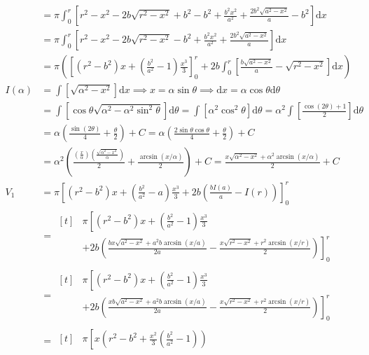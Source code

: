 \documentclass[12pt, A4]{report}
\renewcommand{\d}{\text{d}}
\begin{document}
\begin{enumerate}
\begin{enumerate}
\begin{align*}
									&= \pi\int_0^r\left[r^2 - x^2 - 2b\sqrt{r^2 - x^2} + b^2 - b^2 +  \frac{b^2x^2}{a^2} + \frac{2b^2\sqrt{a^2 - x^2}}{a} - b^2\right]\d x \\
									&= \pi\int_0^r\left[r^2 - x^2 - 2b\sqrt{r^2 - x^2} - b^2 + \frac{b^2x^2}{a^2} + \frac{2b^2\sqrt{a^2 - x^2}}{a}\right]\d x \\
									&= \pi\left(\left[(r^2 - b^2)x + \left(\frac{b^2}{a^2} - 1 \right)\frac{x^3}{3}\right]_0^r + 2b\int_0^r\left[ \frac{b\sqrt{a^2 - x^2}}{a} - \sqrt{r^2 - x^2}\right]\d x\right) \\
								I(\alpha) &= \int\left[\sqrt{\alpha^2 - x^2}\right]\d x 
										\implies x = \alpha\sin\theta 
										\implies \d x = \alpha\cos\theta\d\theta \\
									&= \int\left[\cos\theta\sqrt{\alpha^2 - \alpha^2\sin^2\theta}\right]\d\theta
										= \int\left[\alpha^2\cos^2\theta\right]\d\theta
										= \alpha^2\int\left[\frac{\cos(2\theta) + 1}{2}\right]\d\theta \\
									&= \alpha\left(\frac{\sin(2\theta)}{4} + \frac{\theta}{2}\right) + C
										= \alpha\left(\frac{2\sin\theta\cos\theta}{4} + \frac{\theta}{2}\right) + C \\
									&= \alpha^2\left(\frac{\left(\frac{x}{\alpha}\right)\left(\frac{\sqrt{\alpha^2 - x^2}}{\alpha}\right)}{2} + \frac{\arcsin(x/\alpha)}{2}\right) + C
										= \frac{x\sqrt{\alpha^2 - x^2} + \alpha^2\arcsin(x/\alpha)}{2} + C \\
									V_1 &= \pi\left[(r^2 - b^2)x + \left(\frac{b^2}{a^2} - a\right)\frac{x^3}{3} + 2b\left(\frac{bI(a)}{a} - I(r)\right)\right]_0^r \\
										&= \begin{aligned}[t] &\pi\left[(r^2 - b^2)x + \left(\frac{b^2}{a^2} - 1 \right)\frac{x^3}{3}\right. \\ 
											&\left.+ 2b\left(\frac{bx\sqrt{a^2 - x^2} + a^2b\arcsin(x/a)}{2a} - \frac{x\sqrt{r^2 - x^2} + r^2\arcsin(x/r)}{2}\right)\right]_0^r \end{aligned} \\
										&= \begin{aligned}[t] &\pi\left[(r^2 - b^2)x + \left(\frac{b^2}{a^2} - 1 \right)\frac{x^3}{3}\right. \\ 
											&\left.+ 2b\left(\frac{xb\sqrt{a^2 - x^2} + a^2b\arcsin(x/a)}{2a} - \frac{x\sqrt{r^2 - x^2} + r^2\arcsin(x/r)}{2}\right)\right]_0^r \end{aligned} \\
										&= \begin{aligned}[t]&\pi\left[x\left(r^2 - b^2 + \frac{x^2}{3}\left(\frac{b^2}{a^2} - 1\right)\right)\right. \\ 

\end{aligned}
\end{align*}
\end{enumerate}
\end{enumerate}
\end{document}
